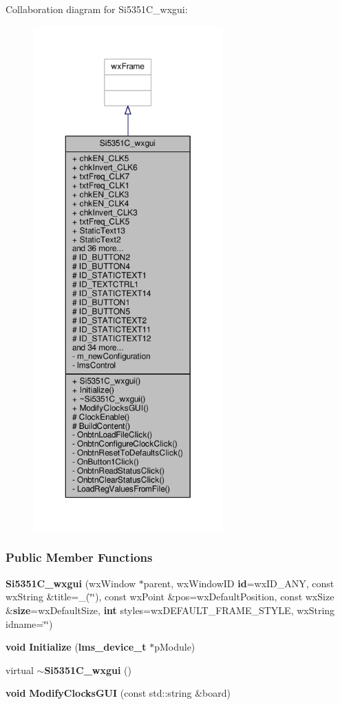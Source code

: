 Collaboration diagram for Si5351\+C\+\_\+wxgui\+:
\nopagebreak
\begin{figure}[H]
\begin{center}
\leavevmode
\includegraphics[height=550pt]{d0/ddf/classSi5351C__wxgui__coll__graph}
\end{center}
\end{figure}
\subsubsection*{Public Member Functions}
\begin{DoxyCompactItemize}
\item 
{\bf Si5351\+C\+\_\+wxgui} (wx\+Window $\ast$parent, wx\+Window\+ID {\bf id}=wx\+I\+D\+\_\+\+A\+NY, const wx\+String \&title=\+\_\+(\char`\"{}\char`\"{}), const wx\+Point \&pos=wx\+Default\+Position, const wx\+Size \&{\bf size}=wx\+Default\+Size, {\bf int} styles=wx\+D\+E\+F\+A\+U\+L\+T\+\_\+\+F\+R\+A\+M\+E\+\_\+\+S\+T\+Y\+LE, wx\+String idname=\char`\"{}\char`\"{})
\item 
{\bf void} {\bf Initialize} ({\bf lms\+\_\+device\+\_\+t} $\ast$p\+Module)
\item 
virtual {\bf $\sim$\+Si5351\+C\+\_\+wxgui} ()
\item 
{\bf void} {\bf Modify\+Clocks\+G\+UI} (const std\+::string \&board)
\end{DoxyCompactItemize}

